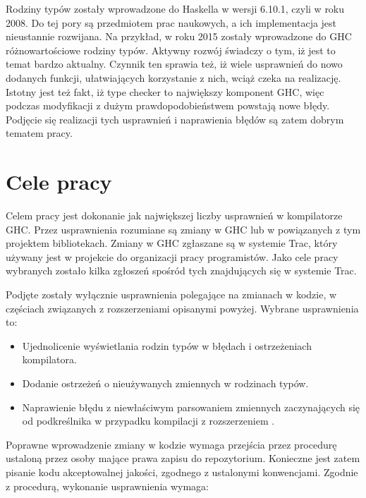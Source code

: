 Rodziny typów zostały wprowadzone do Haskella w wersji 6.10.1, czyli w roku
2008\cite{WikiIndexedTypes}. Do tej pory są przedmiotem prac naukowych, a ich implementacja jest
nieustannie rozwijana. Na przykład, w roku 2015 zostały wprowadzone do GHC
różnowartościowe rodziny typów. Aktywny rozwój świadczy o tym, iż jest to
temat bardzo aktualny. Czynnik ten sprawia też, iż wiele usprawnień do
nowo dodanych funkcji, ułatwiających korzystanie z nich, wciąż czeka na realizację.
Istotny jest też fakt, iż type checker to największy komponent GHC\cite{AOSA},
więc podczas modyfikacji z dużym prawdopodobieństwem powstają nowe błędy.
Podjęcie się realizacji tych usprawnień i naprawienia błędów są zatem dobrym tematem pracy.

\section{Cele pracy}\label{sec:cele_pracy}

Celem pracy jest dokonanie jak największej liczby usprawnień w kompilatorze
GHC. Przez usprawnienia rozumiane są zmiany w GHC lub w powiązanych z tym
projektem bibliotekach. Zmiany w GHC zgłaszane są w systemie Trac, który
używany jest w projekcie do organizacji pracy programistów. Jako cele pracy
wybranych zostało kilka zgłoszeń spośród tych znajdujących się w systemie Trac.

Podjęte zostały wyłącznie usprawnienia polegające na zmianach w
kodzie, w częściach związanych z rozszerzeniami opisanymi powyżej. Wybrane
usprawnienia to:

\begin{itemize}
 \item Ujednolicenie wyświetlania rodzin typów w błędach i ostrzeżeniach kompilatora.
 \item Dodanie ostrzeżeń o nieużywanych zmiennych w rodzinach typów.
 \item Naprawienie błędu z niewłaściwym parsowaniem zmiennych zaczynających się od podkreślnika w przypadku kompilacji z rozszerzeniem .
\end{itemize}

Poprawne wprowadzenie zmiany w kodzie wymaga przejścia przez procedurę ustaloną
przez osoby mające prawa zapisu do repozytorium\cite{WikiFixingBugs}. Konieczne
jest zatem pisanie kodu akceptowalnej jakości, zgodnego z ustalonymi konwencjami.
Zgodnie z procedurą, wykonanie usprawnienia wymaga:

